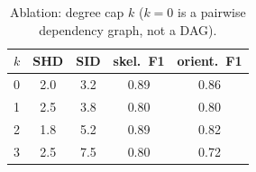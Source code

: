 \begin{table}[htbp]
\centering
\caption{Ablation: degree cap $k$ ($k=0$ is a pairwise dependency graph, not a DAG).}
\label{tab:abl_k}
\begin{tabular}{lcccc}
\hline
$k$ & SHD & SID & skel.\ F1 & orient.\ F1 \\
\hline
0 & 2.0 & 3.2 & 0.89 & 0.86 \\
1 & 2.5 & 3.8 & 0.80 & 0.80 \\
2 & 1.8 & 5.2 & 0.89 & 0.82 \\
3 & 2.5 & 7.5 & 0.80 & 0.72 \\
\hline
\end{tabular}
\end{table}
